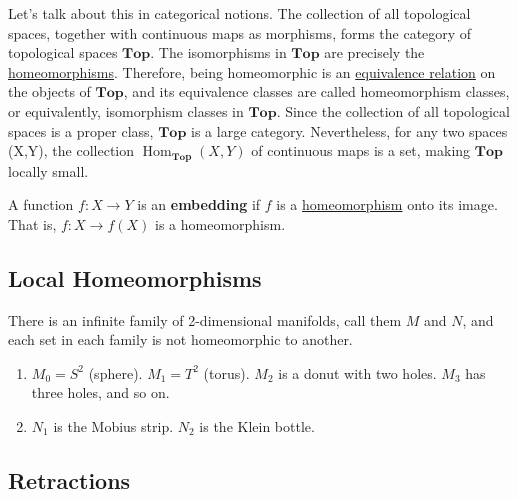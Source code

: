 	Let's talk about this in categorical notions. The collection of all topological spaces, together with continuous maps as morphisms, forms the category of topological spaces $\mathbf{Top}$. The isomorphisms in $\mathbf{Top}$ are precisely the \hyperref[def:homeomorphism]{homeomorphisms}. Therefore, being homeomorphic is an \hyperref[st-def:equivalence_relation]{equivalence relation} on the objects of $\mathbf{Top}$, and its equivalence classes are called homeomorphism classes, or equivalently, isomorphism classes in $\mathbf{Top}$. Since the collection of all topological spaces is a proper class, $\mathbf{Top}$ is a large category. Nevertheless, for any two spaces (X,Y), the collection $\operatorname{Hom}_{\mathbf{Top}}(X,Y)$ of continuous maps is a set, making $\mathbf{Top}$ locally small.

	\begin{definition}[Embedding]
	  \label{def:embedding}
	  A function $f: X \to Y$ is an \textbf{embedding} if $f$ is a \hyperref[def:homeomorphism]{homeomorphism} onto its image. That is, $f: X \to f(X)$ is a homeomorphism. 
	\end{definition}

\subsection{Local Homeomorphisms} 

	\begin{definition}
	  \label{def:locally-homeomorphic}
	  
	\end{definition}

  \begin{example}
    \label{ex:homeomorphism-classes-of-2d-manifolds}
    There is an infinite family of 2-dimensional manifolds, call them $M$ and $N$, and each set in each family is not homeomorphic to another.  
    \begin{enumerate}
      \item $M_0 = S^2$ (sphere). $M_1 = T^2$ (torus). $M_2$ is a donut with two holes. $M_3$ has three holes, and so on. 
      \item $N_1$ is the Mobius strip. $N_2$ is the Klein bottle. 
    \end{enumerate}
  \end{example}

\subsection{Retractions}

